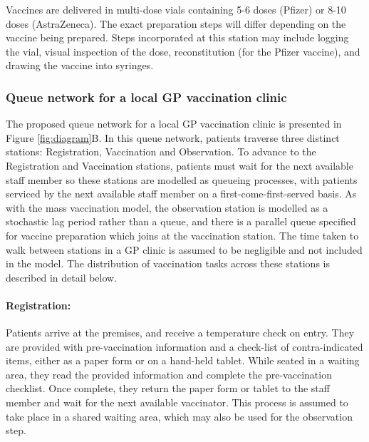 \documentclass{article}
\begin{document}
Vaccines are delivered in multi-dose vials containing 5-6 doses (Pfizer)
or 8-10 doses (AstraZeneca). The exact preparation steps will differ
depending on the vaccine being prepared. Steps incorporated at this
station may include logging the vial, visual inspection of the dose,
reconstitution (for the Pfizer vaccine), and drawing the vaccine into
syringes.

\hypertarget{queue-network-for-a-local-gp-vaccination-clinic}{%
\subsubsection{Queue network for a local GP vaccination
clinic}\label{queue-network-for-a-local-gp-vaccination-clinic}}

The proposed queue network for a local GP vaccination clinic is
presented in Figure \ref{fig:diagram}B. In this queue network, patients
traverse three distinct stations: Registration, Vaccination and
Observation. To advance to the Registration and Vaccination stations,
patients must wait for the next available staff member so these stations
are modelled as queueing processes, with patients serviced by the next
available staff member on a first-come-first-served basis. As with the
mass vaccination model, the observation station is modelled as a
stochastic lag period rather than a queue, and there is a parallel queue
specified for vaccine preparation which joins at the vaccination
station. The time taken to walk between stations in a GP clinic is
assumed to be negligible and not included in the model. The distribution
of vaccination tasks across these stations is described in detail below.

\hypertarget{registration-1}{%
\paragraph{Registration:}\label{registration-1}}

Patients arrive at the premises, and receive a temperature check on
entry. They are provided with pre-vaccination information and a
check-list of contra-indicated items, either as a paper form or on a
hand-held tablet. While seated in a waiting area, they read the provided
information and complete the pre-vaccination checklist. Once complete,
they return the paper form or tablet to the staff member and wait for
the next available vaccinator. This process is assumed to take place in
a shared waiting area, which may also be used for the observation step.
\end{document}
